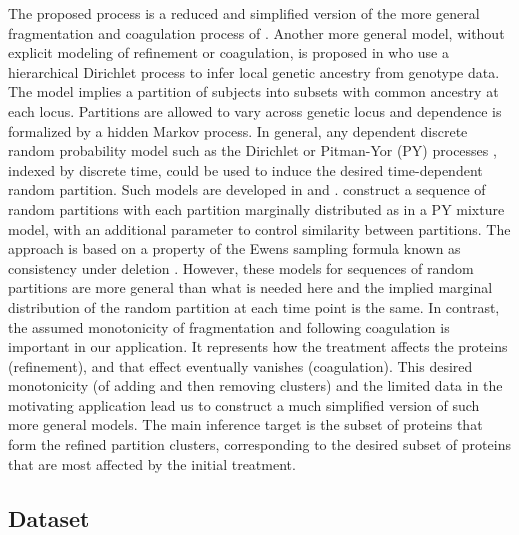 The proposed process is a reduced and simplified version of the more
general fragmentation and coagulation process of \cite{TehAl:11}.
Another more general model, without explicit modeling of refinement or
coagulation,  is proposed in \cite{elliott2018} who use a hierarchical 
Dirichlet process to infer local genetic ancestry from genotype
data. The model implies a partition of subjects into subsets with common
ancestry at each locus. Partitions are allowed to vary across genetic
locus and dependence is formalized by a hidden Markov process.
In general, any
dependent discrete random probability model such as the Dirichlet 
or Pitman-Yor (PY) 
processes \citep{PIYO97}, indexed by discrete time, could be used to
induce the desired time-dependent random partition. Such models are
developed in \cite{caronetal:07} and \cite{rodriguez&terhorst:08}.
\cite{caronetal:07} construct a sequence of random partitions with each
partition marginally distributed as in a PY mixture model, with an
additional parameter to control similarity between partitions. The
approach is based on a property of the Ewens sampling formula known as
consistency under deletion \citep{kingman:78}. However, these models for
sequences of random partitions are more general than what is needed here
and the implied marginal distribution of the random partition at each time point is the same. In contrast, the assumed monotonicity of fragmentation and following
coagulation is important in our application. It represents how the
treatment affects the proteins (refinement), and that effect 
eventually vanishes  (coagulation). This desired monotonicity (of
adding and then removing clusters)
and the limited data in the motivating application 
lead us to construct a much simplified version of such more general
models. The main inference target is the subset of proteins that form the
refined partition clusters, corresponding to the desired subset of proteins
that are most affected by the initial treatment.

\subsection{Dataset}
\label{ss:dataset}

